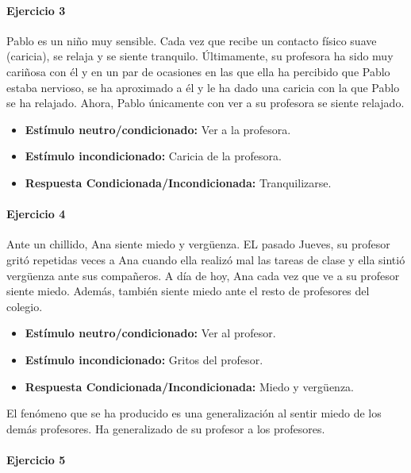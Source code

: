 \documentclass[palatino,nochap]{apuntesURJC}
\begin{document}
\begin{example}
\paragraph{Ejercicio 3}

Pablo es un niño muy sensible. Cada vez que recibe un contacto físico suave (caricia), se relaja y se siente tranquilo. Últimamente, su profesora ha sido muy cariñosa con él y en un par de ocasiones en las que ella ha percibido que Pablo estaba nervioso, se ha aproximado a él y le ha dado una caricia con la que Pablo se ha relajado. Ahora, Pablo únicamente con ver a su profesora se siente relajado.

\begin{itemize}
\item \textbf{Estímulo neutro/condicionado:} Ver a la profesora.
\item \textbf{Estímulo incondicionado:} Caricia de la profesora.
\item \textbf{Respuesta Condicionada/Incondicionada:} Tranquilizarse.
\end{itemize}



\paragraph{Ejercicio 4}
Ante un chillido, Ana siente miedo y vergüenza. EL pasado Jueves, su profesor gritó repetidas veces a Ana cuando ella realizó mal las tareas de clase y ella sintió vergüenza ante sus compañeros. A día de hoy, Ana cada vez que ve a su profesor siente miedo. Además, también siente miedo ante el resto de profesores del colegio.

\begin{itemize}
\item \textbf{Estímulo neutro/condicionado:} Ver al profesor.
\item \textbf{Estímulo incondicionado:} Gritos del profesor.
\item \textbf{Respuesta Condicionada/Incondicionada:} Miedo y vergüenza.
\end{itemize}

El fenómeno que se ha producido es una generalización al sentir miedo de los demás profesores. 
%
Ha generalizado de su profesor a los profesores.

\paragraph{Ejercicio 5}


\end{example}
\end{document}
